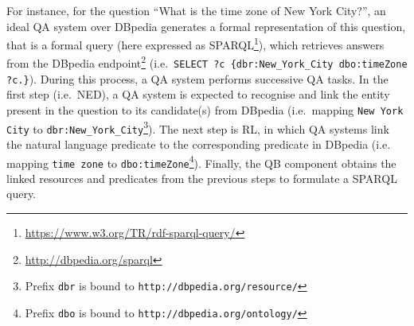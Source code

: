 \documentclass[sigconf,edbt]{acmart-edbt2019}
\newcommand{\qq}[1]{``#1''}
\newcommand{\code}[1]{\texttt{#1}}
\newcommand{\jlt}[1]{\todo[inline, color=cyan]{JL: #1}}
\begin{document}
For instance, for the question \qq{What is the time zone of New York City?}, an ideal QA system over DBpedia generates a formal representation of this question, that is a formal query (here expressed as SPARQL\footnote{\url{https://www.w3.org/TR/rdf-sparql-query/}}), which retrieves answers from the DBpedia endpoint\footnote{\url{http://dbpedia.org/sparql}} (i.e.~\texttt{SELECT ?c \{dbr:New\_York\_City dbo:timeZone ?c.\}}).
During this process, a QA system performs successive QA tasks. In the first step (i.e.~NED), a QA system is expected to recognise and link the entity present in the question to its candidate(s) from DBpedia (i.e.~mapping \texttt{New York City} to \texttt{dbr:New\_York\_City}\footnote{Prefix \code{dbr} is bound to \code{http://dbpedia.org/resource/}}). The next step is RL, in which QA systems link the natural language predicate to the corresponding predicate in DBpedia (i.e. mapping \texttt{time zone} to \texttt{dbo:timeZone}\footnote{Prefix \code{dbo} is bound to \code{http://dbpedia.org/ontology/}}). Finally, the QB component obtains the linked resources and predicates from the previous steps to formulate a SPARQL query.
\end{document}
